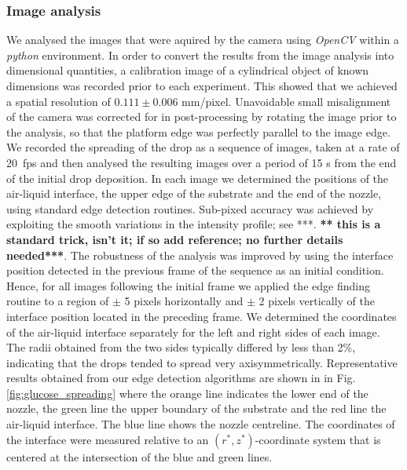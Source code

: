 \documentclass[aip,graphicx]{revtex4-1}
\begin{document}
\subsubsection{Image analysis\label{image}}
We analysed the images that were aquired by the camera using \textit{OpenCV}
\cite{bradski2008learning} within a \textit{python} environment.  In
order to convert the results from the image analysis into dimensional
quantities, a calibration image of a cylindrical object of known
dimensions was recorded prior to each experiment. This showed
that we achieved a spatial resolution of $0.111 \pm 0.006$
mm/pixel. Unavoidable small misalignment of the camera was corrected for in
post-processing by rotating the image prior to the analysis, so that
the platform edge was perfectly parallel to the image edge.
We recorded the spreading of the drop as a sequence of images, taken at a
rate of 20~fps and then analysed the resulting images over a period of 
15 s from the end of the initial drop deposition. In each image we determined 
the positions of the air-liquid interface, the upper edge of the
substrate and the end of the nozzle, using standard edge detection routines.
Sub-pixed accuracy was achieved by exploiting the smooth variations 
in the intensity profile; see ***. {\bf *** this is a standard trick, isn't it; 
if so add reference; no further details needed***}. The robustness of
the analysis was improved by using the interface position detected in the
previous frame of the sequence as an initial condition. Hence, for all
images following the initial frame we applied the edge finding routine
to a region of $\pm$ 5 pixels horizontally and $\pm$ 2 pixels
vertically of the interface position located in the preceding
frame. We determined the coordinates of the air-liquid interface separately
for the left and right sides of each image. The radii obtained from
the two sides typically differed by less than 2\%, indicating that
the drops tended to spread very axisymmetrically. Representative
results obtained from our edge detection algorithms are shown in in Fig. 
\ref{fig:glucose_spreading} where the orange line indicates the lower
end of the nozzle, the green line the upper boundary of the 
substrate and the red line the air-liquid interface. The blue line
shows the nozzle centreline. The coordinates of the interface were 
measured relative to an $(r^*,z^*)$-coordinate system that is centered at
the intersection of the blue and green lines.


\end{document}
